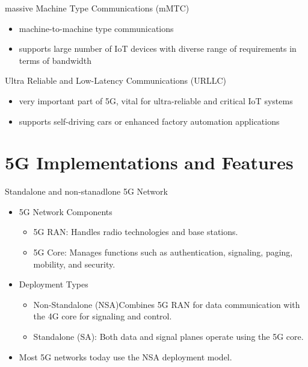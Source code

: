 \documentclass{beamer}
\begin{document}
\begin{frame}{massive Machine Type Communications (mMTC)}
  \vspace*{1.6em}
  \begin{itemize}
    \item machine-to-machine type communications
    \vspace*{0.75em}
    \item supports large number of IoT devices with diverse range of requirements in terms of bandwidth
  \end{itemize}
\end{frame}

\begin{frame}{Ultra Reliable and Low-Latency Communications (URLLC)}
  \vspace*{1.6em}
  \begin{itemize}
    \item very important part of 5G, vital for ultra-reliable and critical IoT systems
    \vspace*{0.75em}
    \item supports self-driving cars or enhanced factory automation applications
  \end{itemize}
\end{frame}

\section[5G Implementations and Features]{5G Implementations and Features}

\begin{frame}{Standalone and non-stanadlone 5G Network}
  \vspace*{1.6em}
  \begin{itemize}
    \item 5G Network Components
    \begin{itemize}
        \item 5G RAN: Handles radio technologies and base stations.
        \item 5G Core: Manages functions such as authentication, signaling, paging, mobility, and security.
    \end{itemize}
    \item Deployment Types
    \begin{itemize}
        \item Non-Standalone (NSA)Combines 5G RAN for data communication with the 4G core for signaling and control.
        \item Standalone (SA): Both data and signal planes operate using the 5G core.
    \end{itemize}
    \item Most 5G networks today use the NSA deployment model.
  \end{itemize}
\end{frame}
\end{document}
